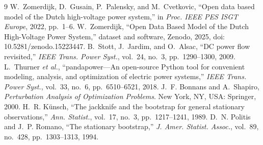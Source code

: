 \documentclass[10pt,journal,onecolumn]{IEEEtran}
\begin{document}
\begin{thebibliography}{9}
W.~Zomerdijk, D.~Gusain, P.~Palensky, and M.~Cvetkovic,
``Open data based model of the Dutch high-voltage power system,'' in
\emph{Proc. IEEE PES ISGT Europe}, 2022, pp.~1--6.
W.~Zomerdijk, ``Open Data Based Model of the Dutch High-Voltage Power System,''
dataset and software, Zenodo, 2025, doi: 10.5281/zenodo.15223447.
B.~Stott, J.~Jardim, and O.~Alsac, ``DC power flow revisited,''
\emph{IEEE Trans. Power Syst.}, vol.~24, no.~3, pp.~1290--1300, 2009.
L.~Thurner \emph{et al.}, ``pandapower---An open-source Python tool for
convenient modeling, analysis, and optimization of electric power systems,''
\emph{IEEE Trans. Power Syst.}, vol.~33, no.~6, pp.~6510--6521, 2018.
J.~F. Bonnans and A.~Shapiro, \emph{Perturbation Analysis of Optimization
Problems}. New York, NY, USA: Springer, 2000.
H.~R. K{\"u}nsch, ``The jackknife and the bootstrap for general stationary
observations,'' \emph{Ann. Statist.}, vol.~17, no.~3, pp.~1217--1241, 1989.
D.~N. Politis and J.~P. Romano, ``The stationary bootstrap,''
\emph{J. Amer. Statist. Assoc.}, vol.~89, no.~428, pp.~1303--1313, 1994.
\end{thebibliography}
\end{document}
